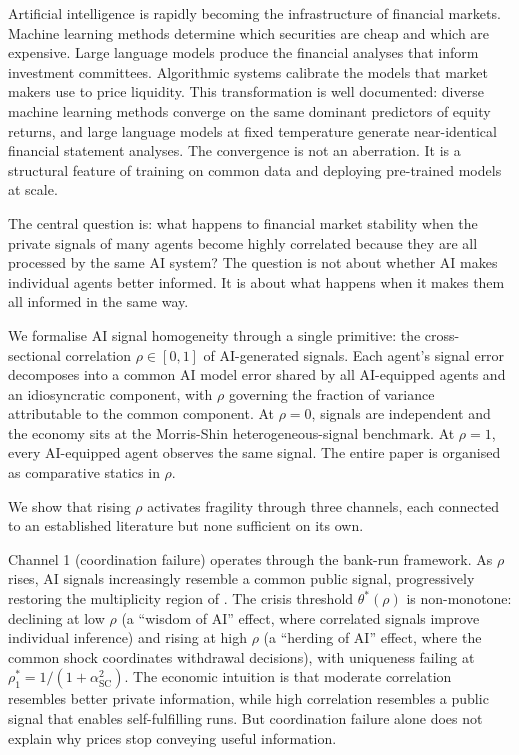 \label{sec:introduction}

Artificial intelligence is rapidly becoming the infrastructure of financial markets. Machine learning methods determine which securities are cheap and which are expensive. Large language models produce the financial analyses that inform investment committees. Algorithmic systems calibrate the models that market makers use to price liquidity. This transformation is well documented: diverse machine learning methods converge on the same dominant predictors of equity returns, and large language models at fixed temperature generate near-identical financial statement analyses. The convergence is not an aberration. It is a structural feature of training on common data and deploying pre-trained models at scale.

The central question is: what happens to financial market stability when the private signals of many agents become highly correlated because they are all processed by the same AI system? The question is not about whether AI makes individual agents better informed. It is about what happens when it makes them all informed in the same way.

We formalise AI signal homogeneity through a single primitive: the cross-sectional correlation $\rho \in [0,1]$ of AI-generated signals. Each agent's signal error decomposes into a common AI model error shared by all AI-equipped agents and an idiosyncratic component, with $\rho$ governing the fraction of variance attributable to the common component. At $\rho = 0$, signals are independent and the economy sits at the Morris-Shin heterogeneous-signal benchmark. At $\rho = 1$, every AI-equipped agent observes the same signal. The entire paper is organised as comparative statics in $\rho$.

We show that rising $\rho$ activates fragility through three channels, each connected to an established literature but none sufficient on its own.

Channel 1 (coordination failure) operates through the \citet{goldstein2005} bank-run framework. As $\rho$ rises, AI signals increasingly resemble a common public signal, progressively restoring the multiplicity region of \citet{hellwig2002}. The crisis threshold $\theta^*(\rho)$ is non-monotone: declining at low $\rho$ (a ``wisdom of AI'' effect, where correlated signals improve individual inference) and rising at high $\rho$ (a ``herding of AI'' effect, where the common shock coordinates withdrawal decisions), with uniqueness failing at $\rho_1^* = 1/(1+\alpha_{\text{SC}}^2)$. The economic intuition is that moderate correlation resembles better private information, while high correlation resembles a public signal that enables self-fulfilling runs. But coordination failure alone does not explain why prices stop conveying useful information.

